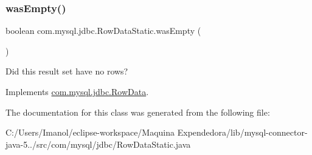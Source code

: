 \subsubsection{\texorpdfstring{was\+Empty()}{wasEmpty()}}
{\footnotesize\ttfamily boolean com.\+mysql.\+jdbc.\+Row\+Data\+Static.\+was\+Empty (\begin{DoxyParamCaption}{ }\end{DoxyParamCaption})}

Did this result set have no rows? 

Implements \mbox{\hyperlink{interfacecom_1_1mysql_1_1jdbc_1_1_row_data_a27df2f8d51aad5e69a5ac330a7b70aac}{com.\+mysql.\+jdbc.\+Row\+Data}}.



The documentation for this class was generated from the following file\+:\begin{DoxyCompactItemize}
\item 
C\+:/\+Users/\+Imanol/eclipse-\/workspace/\+Maquina Expendedora/lib/mysql-\/connector-\/java-\/5../src/com/mysql/jdbc/Row\+Data\+Static.\+java\end{DoxyCompactItemize}
